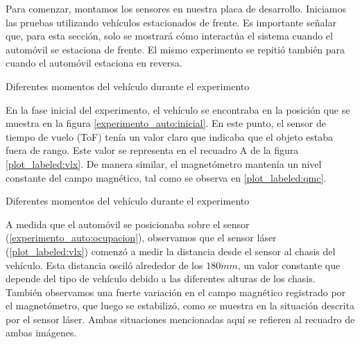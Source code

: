 Para comenzar, montamos los sensores en nuestra placa de desarrollo. Iniciamos las pruebas utilizando vehículos estacionados de frente. Es importante señalar que, para esta sección, solo se mostrará cómo interactúa el sistema cuando el automóvil se estaciona de frente. El mismo experimento se repitió también para cuando el automóvil estaciona en reversa.

\begin{images}[\label{experimento_auto}]{Diferentes momentos del vehículo durante el experimento}
\end{images}

En la fase inicial del experimento, el vehículo se encontraba en la posición que se muestra en la figura \ref{experimento_auto:inicial}. En este punto, el sensor de tiempo de vuelo (ToF) tenía un valor claro que indicaba que el objeto estaba fuera de rango. Este valor se representa en el recuadro A de la figura \ref{plot_labeled:vlx}. De manera similar, el magnetómetro mantenía un nivel constante del campo magnético, tal como se observa en \ref{plot_labeled:qmc}.

\begin{images}[\label{plot_labeled}]{Diferentes momentos del vehículo durante el experimento}
\end{images}

A medida que el automóvil se posicionaba sobre el sensor (\ref{experimento_auto:ocupacion}), observamos que el sensor láser (\ref{plot_labeled:vlx}) comenzó a medir la distancia desde el sensor al chasis del vehículo. Esta distancia osciló alrededor de los $180 mm$, un valor constante que depende del tipo de vehículo debido a las diferentes alturas de los chasis. También observamos una fuerte variación en el campo magnético registrado por el magnetómetro, que luego se estabilizó, como se muestra en la situación descrita por el sensor láser. Ambas situaciones mencionadas aquí se refieren al recuadro  de ambas imágenes.

